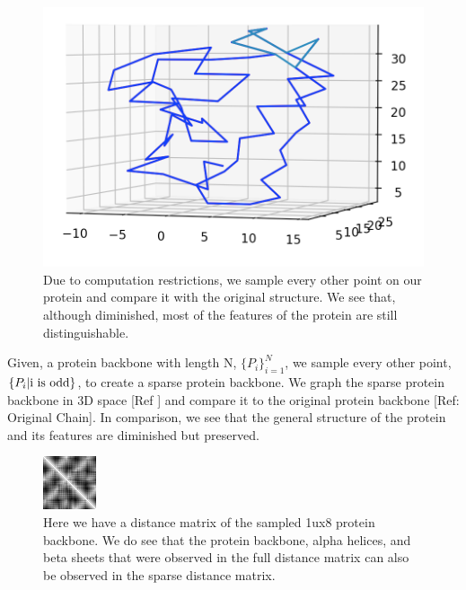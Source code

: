 \documentclass[12pt, a4paper, twocolumn, fullpage]{article}
\theoremstyle{plain}
\theoremstyle{definition}
\theoremstyle{remark}
\begin{document}
\begin{figure}[h]
    \centering
    \includegraphics[width=\linewidth]{1ux8sparse}
    \caption{Due to computation restrictions, we sample every other point on our protein and compare it with the original structure. We see that, although diminished, most of the features of the protein are still distinguishable.}
    \label{1ux8sparse}
\end{figure}

Given, a protein backbone with length N, $\{P_i\}^{N}_{i=1}$, we sample every other point, $\{P_i \space | \space \text{i is odd} \}$, to create a sparse protein backbone. We graph the sparse protein backbone in 3D space [Ref ] and compare it to the original protein backbone [Ref: Original Chain]. In comparison, we see that the general structure of the protein and its features are diminished but preserved.

\begin{figure}[h]
    \centering
    \includegraphics[width=.7\linewidth]{1ux8pdbSparseDistM}
    \caption{Here we have a distance matrix of the sampled 1ux8 protein backbone. We do see that the protein backbone, alpha helices, and beta sheets that were observed in the full distance matrix can also be observed in the sparse distance matrix. }
    \label{1ux8pdbSparseDistM}
\end{figure}
\end{document}
